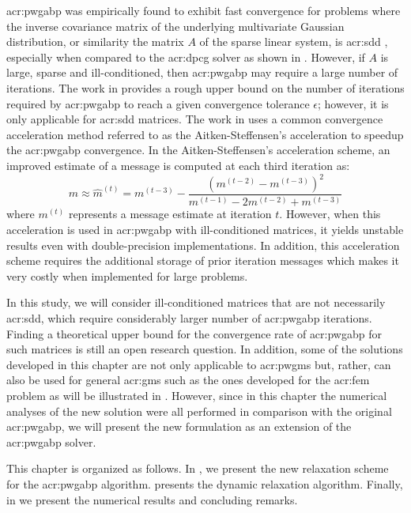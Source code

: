 \gls{acr:pwgabp} was empirically found to exhibit fast convergence for problems where the inverse covariance matrix of the underlying multivariate Gaussian distribution, or similarity the matrix $A$ of the sparse linear system, is \gls{acr:sdd} \cite{bib:Weiss01CorrectnessBelief, bib:Shental2008GBPSSLE}, especially when compared to the \gls{acr:dpcg} solver as shown in .
However, if $A$ is large, sparse and ill-conditioned, then \gls{acr:pwgabp} may require a large number of iterations.
The work in \cite{bib:Weiss01CorrectnessBelief} provides a rough upper bound on the number of iterations required by \gls{acr:pwgabp} to reach a given convergence tolerance $\epsilon$; however, it is only applicable for \gls{acr:sdd} matrices.
The work in \cite{bib:Shental2008GBPSSLE} uses a common convergence acceleration method referred to as the Aitken-Steffensen's acceleration to speedup the \gls{acr:pwgabp} convergence.
In the Aitken-Steffensen's acceleration scheme, an improved estimate of a message is computed at each third iteration as:
\begin{equation}
	m\approx \hat{m}^{(t)}=m^{(t-3)}-\frac{(m^{(t-2)}-m^{(t-3)})^{2}}{m^{(t-1)}-2m^{(t-2)}+m^{(t-3)}}
\end{equation}
where $m^{(t)}$ represents a message estimate at iteration $t$. 
However, when this acceleration is used in \gls{acr:pwgabp} with ill-conditioned matrices, it yields unstable results even with double-precision implementations.
In addition, this acceleration scheme requires the additional storage of prior iteration messages which makes it very costly when implemented for large problems.


In this study, we will consider ill-conditioned matrices that are not necessarily \gls{acr:sdd}, which require considerably larger number of \gls{acr:pwgabp} iterations.
Finding a theoretical upper bound for the convergence rate of \gls{acr:pwgabp} for such matrices is still an open research question.
In addition, some of the solutions developed in this chapter are not only applicable to \glspl{acr:pwgm} but, rather, can also be used for general \glspl{acr:gm} such as the ones developed for the \gls{acr:fem} problem as will be illustrated in .
However, since in this chapter the numerical analyses of the new solution were all performed in comparison with the original \gls{acr:pwgabp}, we will present the new formulation as an extension of the \gls{acr:pwgabp} solver.


This chapter is organized as follows.
In , we present the new relaxation scheme for the \gls{acr:pwgabp} algorithm.
 presents the dynamic relaxation algorithm.
Finally, in  we present the numerical results and concluding remarks.


